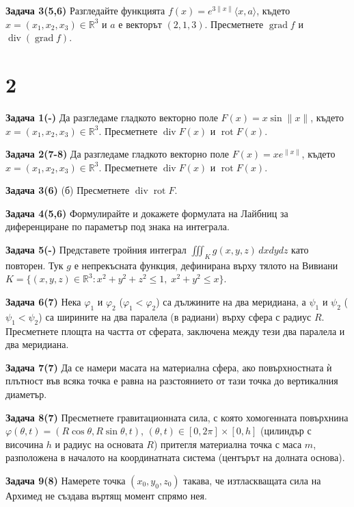 \documentclass[10pt]{article}
\begin{document}
\textbf{Задача 3(5,6) }Разгледайте функцията $f(x) = e^{3\|x\|}\langle x,a\rangle$, където $x = (x_1,x_2,x_3) \in \mathbb{R}^3$ и $a$ е векторът $(2,1,3)$. Пресметнете $\operatorname{grad} f$ и $\operatorname{div}(\operatorname{grad} f)$.

\section*{2}

\textbf{Задача 1(-) }Да разгледаме гладкото векторно поле $F(x) = x \sin\|x\|$, където $x = (x_1,x_2,x_3) \in \mathbb{R}^3$. Пресметнете $\operatorname{div} F(x)$ и $\operatorname{rot} F(x)$. 

\textbf{Задача 2(7-8) }Да разгледаме гладкото векторно поле $F(x) = x e^{\|x\|}$, където $x = (x_1,x_2,x_3) \in \mathbb{R}^3$. Пресметнете $\operatorname{div} F(x)$ и $\operatorname{rot} F(x)$.

\textbf{Задача 3(6) }(б) Пресметнете $\operatorname{div} \operatorname{rot} F$. 

\textbf{Задача 4(5,6) }Формулирайте и докажете формулата на Лайбниц за диференциране по параметър под знака на интеграла. 

\textbf{Задача 5(-) }Представете тройния интеграл $\iiint_K g(x,y,z) \,dxdydz$ като повторен. Тук $g$ е непрекъсната функция, дефинирана върху тялото на Вивиани $K = \{(x,y,z)\in\mathbb{R}^3: x^2+y^2+z^2 \le 1,\; x^2+y^2 \le x\}$. 

\textbf{Задача 6(7) }Нека $\varphi_1$ и $\varphi_2$ ($\varphi_1<\varphi_2$) са дължините на два меридиана, а $\psi_1$ и $\psi_2$ ($\psi_1<\psi_2$) са ширините на два паралела (в радиани) върху сфера с радиус $R$. Пресметнете площта на частта от сферата, заключена между тези два паралела и два меридиана. 

\textbf{Задача 7(7) }Да се намери масата на материална сфера, ако повърхностната ѝ плътност във всяка точка е равна на разстоянието от тази точка до вертикалния диаметър. 

\textbf{Задача 8(7) }Пресметнете гравитационната сила, с която хомогенната повърхнина $\varphi(\theta,t) = (R\cos\theta, R\sin\theta, t)$, $(\theta,t)\in[0,2\pi]\times[0,h]$ (цилиндър с височина $h$ и радиус на основата $R$) притегля материална точка с маса $m$, разположена в началото на координатната система (центърът на долната основа).

\textbf{Задача 9(8) }Намерете точка $(x_0,y_0,z_0)$ такава, че изтласкващата сила на Архимед не създава въртящ момент спрямо нея. 
\end{document}
